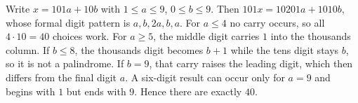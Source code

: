 Write $x=101a+10b$ with $1\le a\le9$, $0\le b\le9$. Then $101x=10201a+1010b$, whose formal digit pattern is $a,b,2a,b,a$. For $a\le4$ no carry occurs, so all $4\cdot10=40$ choices work.
For $a\ge5$, the middle digit carries $1$ into the thousands column. If $b\le8$, the thousands digit becomes $b+1$ while the tens digit stays $b$, so it is not a palindrome. If $b=9$, that carry raises the leading digit, which then differs from the final digit $a$. A six-digit result can occur only for $a=9$ and begins with $1$ but ends with $9$. Hence there are exactly $\boxed{40}$.
